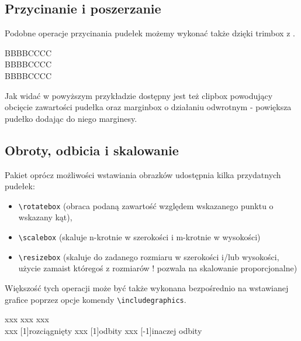 \documentclass[fontSize=10pt,extra]{pdfArticle}
\begin{document}
\subsection{Przycinanie i poszerzanie}

Podobne operacje przycinania pudełek możemy wykonać także dzięki trimbox z .
\begin{Example}
BBBBCCCC \\
BBBBCCCC \\
BBBBCCCC
\end{Example}

Jak widać w powyższym przykładzie dostępny jest też clipbox powodujący obcięcie zawartości pudełka oraz marginbox o działaniu odwrotnym - powiększa pudełko dodając do niego marginesy.


\subsection{Obroty, odbicia i skalowanie}

Pakiet  oprócz możliwości wstawiania obrazków udostępnia kilka przydatnych pudełek:
\vspace{-\parskip}\begin{itemize}
\item \Verb#\rotatebox# (obraca podaną zawartość względem wskazanego punktu o wskazany kąt),
\item \Verb#\scalebox# (skaluje n-krotnie w szerokości i m-krotnie w wysokości)
\item \Verb#\resizebox# (skaluje do zadanego rozmiaru w szerokości i/lub wysokości, użycie zamaist któregoś z rozmiarów ! pozwala na skalowanie proporcjonalne)
\end{itemize}
Większość tych operacji może być także wykonana bezpośrednio na wstawianej grafice poprzez opcje komendy \Verb#\includegraphics#.

\begin{ExampleVertical}
xxx  xxx
xxx \\
xxx \scalebox{3}[1]{rozciągnięty} xxx \scalebox{-1}[1]{odbity} xxx \scalebox{1}[-1]{inaczej odbity}
\end{ExampleVertical}
\end{document}
